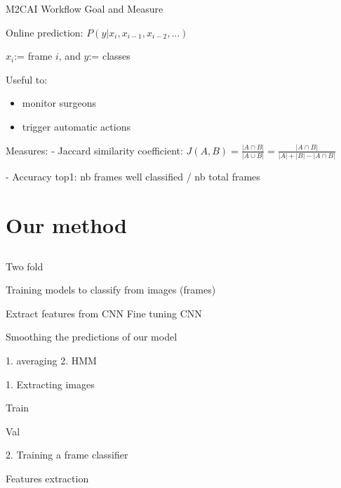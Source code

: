 \begin{frame}{M2CAI Workflow Goal and Measure}
	
	  Online prediction: $P(y | x_i, x_{i-1}, x_{i-2}, ...)$  
		
		$x_i$:= frame $i$, and $y$:= classes
		
		
		
		Useful to:
		\begin{itemize}
			\item monitor surgeons
			\item trigger automatic actions
		\end{itemize}
		
		
		Measures:
		- Jaccard similarity coefficient:
	    $J(A,B) = \frac{| A \cap B |}{| A \cup B|} = \frac{| A \cap B |}{| A| + |B| - |A \cap B|}$
	    
	  - Accuracy top1: nb frames well classified / nb total frames
		
\end{frame}




\section{Our method} \subsection{}\label{}

\begin{frame}{Two fold}

	Training models to classify from images (frames)
	
	Extract features from CNN
	Fine tuning CNN
	
	Smoothing the predictions of our model
	
	1. averaging
	2. HMM
	
\end{frame}


\begin{frame}{1. Extracting images}

	Train
	
	Val

\end{frame}

\begin{frame}{2. Training a frame classifier}

	Features extraction
	

\end{frame}

